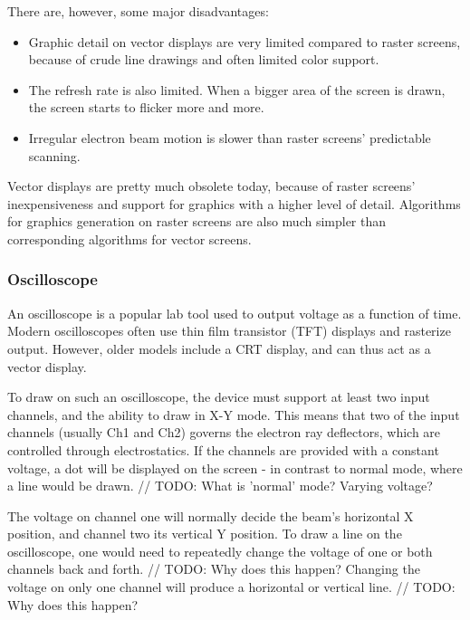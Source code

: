There are, however, some major disadvantages:
\begin{itemize}
\item Graphic detail on vector displays are very limited compared to raster screens, because of crude line drawings and often limited color support.
\item The refresh rate is also limited. When a bigger area of the screen is drawn, the screen starts to flicker more and more.
\item Irregular electron beam motion is slower than raster screens' predictable scanning.
\end{itemize} 

Vector displays are pretty much obsolete today, because of raster screens' inexpensiveness and support for graphics with a higher level of detail. 
Algorithms for graphics generation on raster screens are also much simpler than corresponding algorithms for vector screens.

\subsubsection{Oscilloscope}
An oscilloscope is a popular lab tool used to output voltage as a function of time.
Modern oscilloscopes often use thin film transistor (TFT) displays and rasterize output. 
However, older models include a CRT display, and can thus act as a vector display.

To draw on such an oscilloscope, the device must support at least two input channels, and the ability to draw in X-Y mode.
This means that two of the input channels (usually Ch1 and Ch2) governs the electron ray deflectors, which are controlled through electrostatics.
If the channels are provided with a constant voltage, a dot will be displayed on the screen - in contrast to normal mode, where a line would be drawn. // TODO: What is 'normal' mode? Varying voltage?

The voltage on channel one will normally decide the beam's horizontal X position, and channel two its vertical Y position.
To draw a line on the oscilloscope, one would need to repeatedly change the voltage of one or both channels back and forth. // TODO: Why does this happen?
Changing the voltage on only one channel will produce a horizontal or vertical line. // TODO: Why does this happen?

